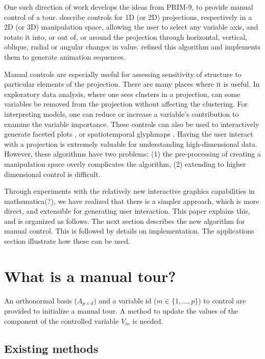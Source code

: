 \documentclass[]{interact}
\theoremstyle{plain}%
\theoremstyle{definition}
\theoremstyle{remark}
\begin{document}
One such direction of work develops the ideas from PRIM-9, to provide
manual control of a tour. \citet{cook_manual_1997} describe controls for
1D (or 2D) projections, respectively in a 2D (or 3D) manipulation space,
allowing the user to select any variable axis, and rotate it into, or
out of, or around the projection through horizontal, vertical, oblique,
radial or angular changes in value. \citet{spyrison_spinifex_2020}
refined this algorithm and implements them to generate animation
sequences.

Manual controls are especially useful for assessing sensitivity of
structure to particular elements of the projection. There are many
places where it is useful. In exploratory data analysis, where one sees
clusters in a projection, can some variables be removed from the
projection without affecting the clustering. For interpreting models,
one can reduce or increase a variable's contribution to examine the
variable importance. These controls can also be used to interactively
generate faceted plots \citep{XXX}, or spatiotemporal glyphmaps
\citep{XXX}. Having the user interact with a projection is extremely
valuable for understanding high-dimensional data. However, these
algorithms have two problems: (1) the pre-processing of creating a
manipulation space overly complicates the algorithm, (2) extending to
higher dimensional control is difficult.

Through experiments with the relatively new interactive graphics
capabilities in mathematica(?), we have realized that there is a simpler
approach, which is more direct, and extensible for generating user
interaction. This paper explains this, and is organized as follows. The
next section describes the new algorithm for manual control. This is
followed by details on implementation. The applications section
illustrate how these can be used.

\hypertarget{sec:method}{%
\section{What is a manual tour?}\label{sec:method}}

An orthonormal basis (\(A_{p\times d}\)) and a variable id
(\(m \in \{1, ..., p\}\)) to control are provided to initialize a manual
tour. A method to update the values of the component of the controlled
variable \(V_m\) is needed.

\hypertarget{existing-methods}{%
\subsection{Existing methods}\label{existing-methods}}
\end{document}
